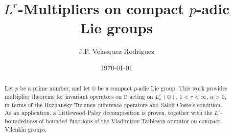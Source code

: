 \documentclass[12pt, reqno]{amsart}
\newcommand{\1}{\mathds{1}}
\begin{document}
\title[$L^r$-Multipliers on compact $p$-adic Lie groups. ]
 {$L^r$-Multipliers on compact $p$-adic Lie groups }


\author{
  J.P. Velasquez-Rodriguez
}

\newcommand{\Addresses}{{%
  \bigskip
  \footnotesize

 

 J.P. Velasquez-Rodriguez, \textsc{Departamento de ciencias naturales y matematicas, Pontificia Universidad Javeriana, Cali-Colombia}\par\nopagebreak
  \textit{E-mail address:} \texttt{juanpablovr2025@gmail.com / juanpablo.velasquez@javerianacali.edu.co}}

}








\date{\today}
\begin{abstract}
Let $p$ be a prime number, and let $\mathbb{G}$ be a compact $p$-adic Lie group. This work provides multiplier theorems for invariant operators on $\mathbb{G}$ acting on $L^r_\alpha(\mathbb{G})$, $1<r<\infty$, $\alpha>0$, in terms of the Ruzhansky-Turunen difference operators and Saloff-Coste's condition. As an application, a Littlewood-Paley decomposition is proven, together with the $L^r$-boundedness of bounded functions of the Vladimirov-Taibleson operator on compact Vilenkin groups.  
\end{abstract}
\maketitle
\tableofcontents
\end{document}
